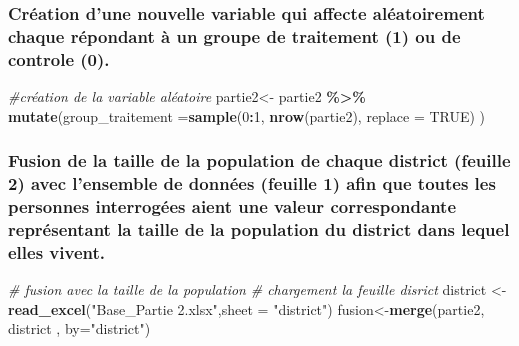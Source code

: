 \documentclass[
]{article}
\newenvironment{Shaded}{\begin{snugshade}}{\end{snugshade}}
\newcommand{\AttributeTok}[1]{\textcolor[rgb]{0.13,0.29,0.53}{#1}}
\newcommand{\CommentTok}[1]{\textcolor[rgb]{0.56,0.35,0.01}{\textit{#1}}}
\newcommand{\ConstantTok}[1]{\textcolor[rgb]{0.56,0.35,0.01}{#1}}
\newcommand{\DecValTok}[1]{\textcolor[rgb]{0.00,0.00,0.81}{#1}}
\newcommand{\FunctionTok}[1]{\textcolor[rgb]{0.13,0.29,0.53}{\textbf{#1}}}
\newcommand{\NormalTok}[1]{#1}
\newcommand{\OtherTok}[1]{\textcolor[rgb]{0.56,0.35,0.01}{#1}}
\newcommand{\SpecialCharTok}[1]{\textcolor[rgb]{0.81,0.36,0.00}{\textbf{#1}}}
\newcommand{\StringTok}[1]{\textcolor[rgb]{0.31,0.60,0.02}{#1}}
\begin{document}
\hypertarget{cruxe9ation-dune-nouvelle-variable-qui-affecte-aluxe9atoirement-chaque-ruxe9pondant-uxe0-un-groupe-de-traitement-1-ou-de-controle-0.}{%
\subsubsection{Création d'une nouvelle variable qui affecte
aléatoirement chaque répondant à un groupe de traitement (1) ou de
controle
(0).}\label{cruxe9ation-dune-nouvelle-variable-qui-affecte-aluxe9atoirement-chaque-ruxe9pondant-uxe0-un-groupe-de-traitement-1-ou-de-controle-0.}}

\begin{Shaded}
\begin{Highlighting}[]
\CommentTok{\#création de la variable aléatoire }
\NormalTok{partie2}\OtherTok{\textless{}{-}}\NormalTok{ partie2 }\SpecialCharTok{\%\textgreater{}\%} \FunctionTok{mutate}\NormalTok{(}\AttributeTok{group\_traitement =}\FunctionTok{sample}\NormalTok{(}\DecValTok{0}\SpecialCharTok{:}\DecValTok{1}\NormalTok{, }\FunctionTok{nrow}\NormalTok{(partie2), }
                                                      \AttributeTok{replace =} \ConstantTok{TRUE}\NormalTok{) )}
\end{Highlighting}
\end{Shaded}

\hypertarget{fusion-de-la-taille-de-la-population-de-chaque-district-feuille-2-avec-lensemble-de-donnuxe9es-feuille-1-afin-que-toutes-les-personnes-interroguxe9es-aient-une-valeur-correspondante-repruxe9sentant-la-taille-de-la-population-du-district-dans-lequel-elles-vivent.}{%
\subsubsection{Fusion de la taille de la population de chaque district
(feuille 2) avec l'ensemble de données (feuille 1) afin que toutes les
personnes interrogées aient une valeur correspondante représentant la
taille de la population du district dans lequel elles
vivent.}\label{fusion-de-la-taille-de-la-population-de-chaque-district-feuille-2-avec-lensemble-de-donnuxe9es-feuille-1-afin-que-toutes-les-personnes-interroguxe9es-aient-une-valeur-correspondante-repruxe9sentant-la-taille-de-la-population-du-district-dans-lequel-elles-vivent.}}

\begin{Shaded}
\begin{Highlighting}[]
\CommentTok{\# fusion avec la taille de la population}
\CommentTok{\# chargement la feuille disrict }
\NormalTok{district }\OtherTok{\textless{}{-}} \FunctionTok{read\_excel}\NormalTok{(}\StringTok{"Base\_Partie 2.xlsx"}\NormalTok{,}\AttributeTok{sheet =} \StringTok{"district"}\NormalTok{)}
\NormalTok{fusion}\OtherTok{\textless{}{-}}\FunctionTok{merge}\NormalTok{(partie2, district , }\AttributeTok{by=}\StringTok{"district"}\NormalTok{)}
\end{Highlighting}
\end{Shaded}
\end{document}

